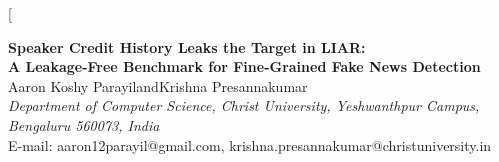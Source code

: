 \documentclass[10pt,twocolumn,twoside,a4paper]{article}
\begin{document}
\twocolumn[{%
\vspace*{-6mm}
\begin{center}
{\large\bfseries Speaker Credit History Leaks the Target in LIAR:\\[2pt]
 A Leakage-Free Benchmark for Fine-Grained Fake News Detection}\\[10pt]
{\normalsize Aaron Koshy Parayil\quad and\quad Krishna Presannakumar}\\[4pt]
{\footnotesize\itshape Department of Computer Science, Christ University,
 Yeshwanthpur Campus, Bengaluru 560073, India}\\[3pt]
{\footnotesize E-mail: aaron12parayil@gmail.com, %
 krishna.presannakumar@christuniversity.in}\\[8pt]
\end{center}

}
\end{document}
